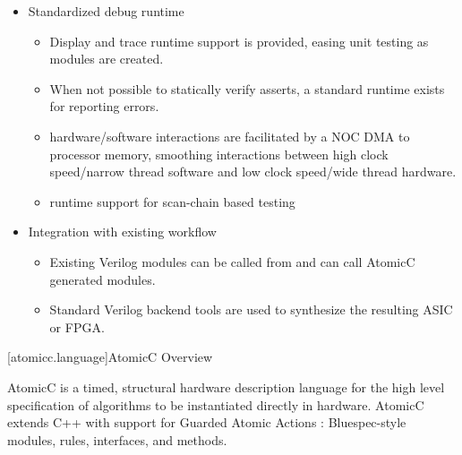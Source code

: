 \begin{itemize}
\item Standardized debug runtime
\begin{itemize}
\item Display and trace runtime support is provided, easing unit testing
as modules are created.
\item When not possible to statically verify asserts, a standard runtime exists for reporting errors.
\item hardware/software interactions are facilitated by a NOC DMA to processor memory,
smoothing interactions between high clock speed/narrow thread software and low clock
speed/wide thread hardware.
\item runtime support for scan-chain based testing
\end{itemize}
\item Integration with existing workflow
\begin{itemize}
\item Existing Verilog modules can be called from and can call AtomicC generated modules.
\item Standard Verilog backend tools are used to synthesize the resulting ASIC or FPGA.
\end{itemize}
\end{itemize}

[atomicc.language]{AtomicC Overview}

AtomicC is a timed, structural hardware description language for
the high level specification of algorithms to be instantiated
directly in hardware.
AtomicC extends C++
with support for Guarded Atomic Actions
\cite{Hoe:Thesis,HoeArvind:TRSSynthesis2,Dave2007}:
Bluespec-style\cite{Bluespec:www}
modules, rules, interfaces, and methods.


